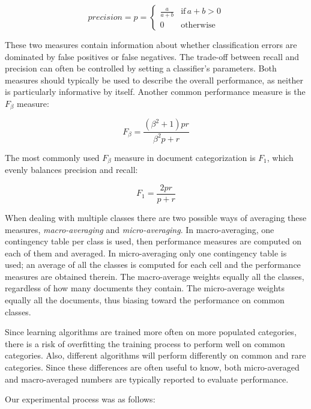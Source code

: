 \documentclass[a4paper,twocolumn]{article}
\begin{document}
\begin{displaymath}
precision = p = \left\{ \begin{array}{ll}
\frac{a}{a+b} & \textrm{if} \, a+b>0 \\
0                  & \textrm{otherwise}
\end{array} \right.
\end{displaymath}

These two measures contain information about whether classification errors are dominated by false positives or false negatives.  The trade-off between recall and precision can often be controlled by setting a classifier's parameters. Both measures should typically be used to describe the overall performance, as neither is particularly informative by itself. Another common performance measure is the $F_\beta$ measure:

\begin{displaymath}
F_\beta = \frac{(\beta^2 + 1)pr}{\beta^2 p + r}
\end{displaymath}

The most commonly used $F_\beta$ measure in document categorization is $F_1$, which evenly balances precision and recall:

\begin{displaymath}
F_1 = \frac{2pr}{p + r}
\end{displaymath}

When dealing with multiple classes there are two possible ways of averaging these measures, \emph{macro-averaging} and \emph{micro-averaging}. In macro-averaging, one contingency table per class is used, then performance measures are computed on each of them and averaged. In micro-averaging only one contingency table is used; an average of all the classes is computed for each cell and the performance measures are obtained therein. The macro-average weights equally all the classes, regardless of how many documents they contain. The micro-average weights equally all the documents, thus biasing toward the performance on common classes.

Since learning algorithms are trained more often on more populated
categories, there is a risk of overfitting the training process to
perform well on common categories.  Also, different algorithms will
perform differently on common and rare categories.  Since these
differences are often useful to know, both micro-averaged and
macro-averaged numbers are typically reported to evaluate performance.

Our experimental process was as follows:
\end{document}
